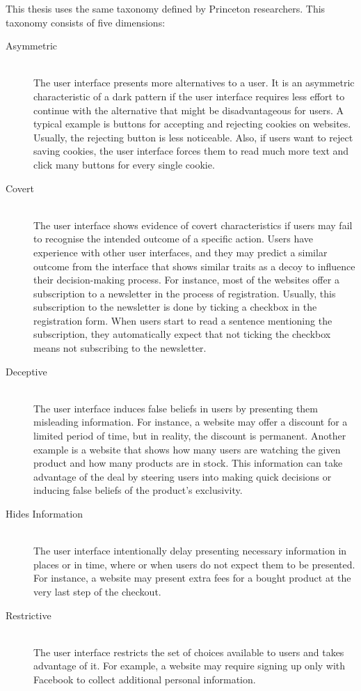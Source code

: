 This thesis uses the same taxonomy defined by Princeton researchers. This taxonomy consists of five dimensions:

\begin{description}
    \item[Asymmetric] \hfill \\ The user interface presents more alternatives to a user. It is an asymmetric characteristic of a dark pattern if the user interface requires less effort to continue with the alternative that might be disadvantageous for users. A typical example is buttons for accepting and rejecting cookies on websites. Usually, the rejecting button is less noticeable. Also, if users want to reject saving cookies, the user interface forces them to read much more text and click many buttons for every single cookie.
    \item[Covert] \hfill \\ The user interface shows evidence of covert characteristics if users may fail to recognise the intended outcome of a specific action. Users have experience with other user interfaces, and they may predict a similar outcome from the interface that shows similar traits as a decoy to influence their decision-making process. For instance, most of the websites offer a subscription to a newsletter in the process of registration. Usually, this subscription to the newsletter is done by ticking a checkbox in the registration form. When users start to read a sentence mentioning the subscription, they automatically expect that not ticking the checkbox means not subscribing to the newsletter.
    \item[Deceptive] \hfill \\ The user interface induces false beliefs in users by presenting them misleading information. For instance, a website may offer a discount for a limited period of time, but in reality, the discount is permanent. Another example is a website that shows how many users are watching the given product and how many products are in stock. This information can take advantage of the deal by steering users into making quick decisions or inducing false beliefs of the product's exclusivity.
    \item[Hides Information] \hfill \\ The user interface intentionally delay presenting necessary information in places or in time, where or when users do not expect them to be presented. For instance, a website may present extra fees for a bought product at the very last step of the checkout.
    \item[Restrictive] \hfill \\ The user interface restricts the set of choices available to users and takes advantage of it. For example, a website may require signing up only with Facebook to collect additional personal information.
\end{description}

